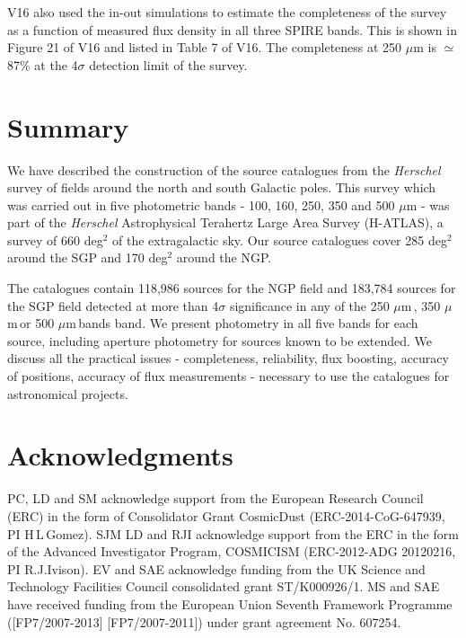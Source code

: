 \documentclass[useAMS,usenatbib]{mnras}
\def\mic{ $\mu $m\,}
\begin{document}
V16 also used the in-out simulations to estimate the completeness of
the survey as a function of measured flux density in all three SPIRE
bands. This is shown in Figure 21 of V16 and listed in Table 7 of
V16. The completeness at 250 $\mu$m is $\simeq$87\% at the 4$\sigma$
detection limit of the survey.



\section{Summary}

We have described the construction of the source catalogues from the
{\it Herschel} survey of fields around the north and south Galactic
poles. This survey which was carried out in five photometric bands -
100, 160, 250, 350 and 500 $\mu$m - was part of the {\it Herschel}
Astrophysical Terahertz Large Area Survey (H-ATLAS), a survey of 660
deg$^2$ of the extragalactic sky. Our source catalogues cover 285
deg$^2$ around the SGP and 170 deg$^2$ around the NGP.

The catalogues contain 118,986 sources for the NGP field and 183,784
sources for the SGP field detected at more than 4$\sigma$ significance
in any of the 250\mic, 350\mic or 500\mic bands band. We present
photometry in all five bands for each source, including aperture
photometry for sources known to be extended. We discuss all the
practical issues - completeness, reliability, flux boosting, accuracy
of positions, accuracy of flux measurements - necessary to use the
catalogues for astronomical projects.

\section*{Acknowledgments}

PC, LD and SM acknowledge support from the European Research Council
(ERC) in the form of Consolidator Grant {\sc CosmicDust}
(ERC-2014-CoG-647939, PI H\,L\,Gomez).  SJM LD and RJI acknowledge
support from the ERC in the form of the Advanced Investigator
Program, COSMICISM (ERC-2012-ADG 20120216, PI R.J.Ivison).  EV and SAE
acknowledge funding from the UK Science and Technology Facilities
Council consolidated grant ST/K000926/1.  MS and SAE have received
funding from the European Union Seventh Framework Programme
([FP7/2007-2013] [FP7/2007-2011]) under grant agreement No. 607254.
\end{document}
